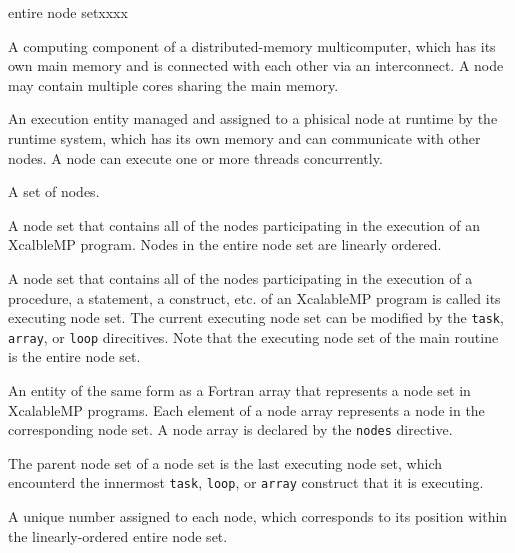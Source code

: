 \begin{namelist}{entire node setxxxx}


 A computing component of a distributed-memory multicomputer, which has
 its own main memory and is connected with each other via an
 interconnect. A node may contain multiple cores sharing the main
 memory.



 An execution entity managed and assigned to a phisical node at runtime
 by the {\XMP} runtime system, which has its own memory and can
 communicate with other nodes. A node can execute one or more threads
 concurrently.


 A set of nodes.


 A node set that contains all of the nodes participating in the
 execution of an XcalbleMP program. Nodes in the entire node set are
 linearly ordered.


 A node set that contains all of the nodes participating in the
 execution of a procedure, a statement, a construct, etc. of an
 XcalableMP program is called its executing node set. The current
 executing node set can be modified by the {\tt task}, {\tt array}, or
 {\tt loop} direcitives. Note that the executing node set of the main
 routine is the entire node set.


 An entity of the same form as a Fortran array that represents a node
 set in XcalableMP programs. Each element of a node array represents a
 node in the corresponding node set. A node array is declared by the
 {\tt nodes} directive.


 The parent node set of a node set is the last executing node set, which
 encounterd the innermost {\tt task}, {\tt loop}, or {\tt array}
 construct that it is executing.


 A unique number assigned to each node, which corresponds to its
 position within the linearly-ordered entire node set.


\end{namelist}
